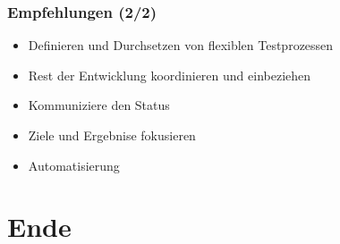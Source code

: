 \begin{frame}
	\frametitle{Empfehlungen (2/2)}
	\begin{itemize}
		\item Definieren und Durchsetzen von flexiblen Testprozessen
		\item Rest der Entwicklung koordinieren und einbeziehen
		\item Kommuniziere den Status
		\item Ziele und Ergebnise fokusieren
		\item Automatisierung
	\end{itemize}
\end{frame}

\section{Ende}
\begin{frame}
\end{frame}